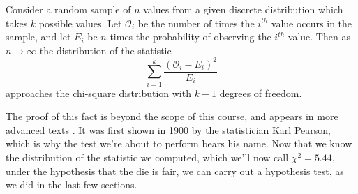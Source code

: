 \begin{proposition}\label{ChiSquareNullDist}
Consider a random sample of $n$ values from a given discrete distribution which takes $k$ possible values. Let $\mathcal{O}_i$ be the number of times the $i^{th}$ value occurs in the sample, and let $E_i$ be $n$ times the probability of observing the $i^{th}$ value. Then as $n \to \infty$ the distribution of the statistic 
$$\sum_{i=1}^k \frac{(\mathcal{O}_i - E_i)^2}{E_i}$$
approaches the chi-square distribution with $k-1$ degrees of freedom.
\end{proposition}

The proof of this fact is beyond the scope of this course, and appears in more advanced texts \cite{vanderVaart}. It was first shown in 1900 by the statistician Karl Pearson, which is why the test we're about to perform bears his name. Now that we know the distribution of the statistic we computed, which we'll now call $\chi^2 = 5.44$, under the hypothesis that the die is fair, we can carry out a hypothesis test, as we did in the last few sections.

